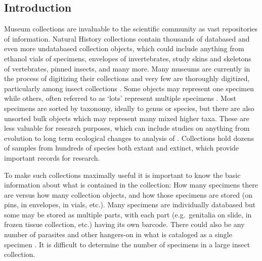 \vspace{4mm}

\begin{multicols}{2}

\section{Introduction} 

Museum collections are invaluable to the scientific community as vast repositories of information. Natural History collections contain thousands of databased and even more undatabased collection objects, which could include anything from ethanol vials of specimens, envelopes of invertebrates, study skins and skeletons of vertebrates, pinned insects, and many more. Many museums are currently in the process of digitizing their collections and very few are thoroughly digitized, particularly among insect collections \citep{Sikesetal2016}. Some objects may represent one specimen while others, often referred to as ‘lots’ represent multiple specimens \citep{Sikes2015}. Most specimens are sorted by taxonomy, ideally to genus or species, but there are also unsorted bulk objects which may represent many mixed higher taxa. These are less valuable for research purposes, which can include studies on anything from evolution to long term ecological changes \citep{MunozPrice2019} to analysis of  \citep{vanderValketal2017}. Collections hold dozens of samples from hundreds of species both extant and extinct, which provide important records for research. 

To make such collections maximally useful it is important to know the basic information about what is contained in the collection: How many specimens there are versus how many collection objects, and how those specimens are stored (on pins, in envelopes, in vials, etc.). Many specimens are individually databased but some may be stored as multiple parts, with each part (e.g.\ genitalia on slide,  in frozen tissue collection, etc.) having its own barcode. There could also be any number of parasites and other hangers-on in what is cataloged as a single specimen \citep{Welickyetal2019, Sikes2015}. It is difficult to determine the number of specimens in a large insect collection. 
	

\end{multicols}
